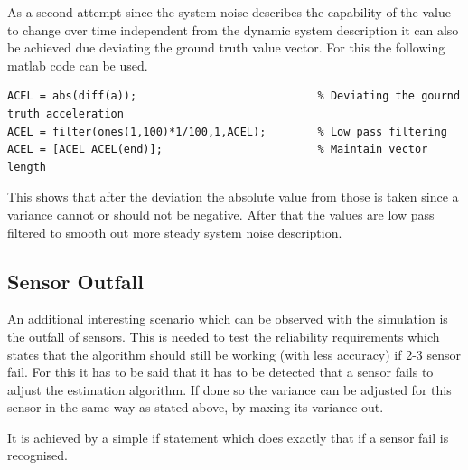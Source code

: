 As a second attempt since the system noise describes the capability of the value to change over time independent from the dynamic system description 
it can also be achieved due deviating the ground truth value vector.
For this the following matlab code can be used.
\begin{lstlisting}[caption={System noise generation with deviation}]
ACEL = abs(diff(a));                            % Deviating the gournd truth acceleration
ACEL = filter(ones(1,100)*1/100,1,ACEL);        % Low pass filtering
ACEL = [ACEL ACEL(end)];                        % Maintain vector length
\end{lstlisting}
This shows that after the deviation the absolute value from those is taken since a variance cannot or should not be negative.
After that the values are low pass filtered to smooth out more steady system noise description.

\subsection{Sensor Outfall}

An additional interesting scenario which can be observed with the simulation is the outfall of sensors.
This is needed to test the reliability requirements which states that the algorithm should still be working (with less accuracy) if 2-3 sensor fail.
For this it has to be said that it has to be detected that a sensor fails to adjust the estimation algorithm.
If done so the variance can be adjusted for this sensor in the same way as stated above, by maxing its variance out.

It is achieved by a simple if statement which does exactly that if a sensor fail is recognised.

